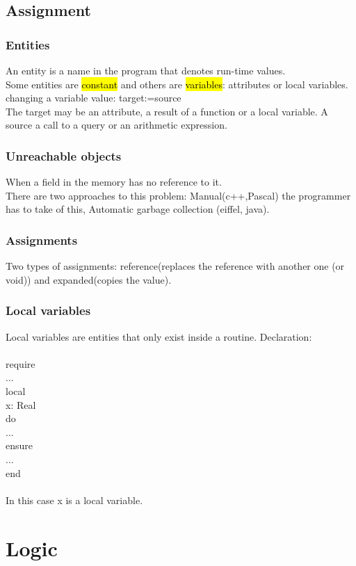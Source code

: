 \documentclass[11pt]{article}
\newcommand\tab[1][1cm]{\hspace*{#1}}
\begin{document}
\subsection{Assignment}
\subsubsection{Entities}
An entity is a name in the program that denotes run-time values.\\ Some entities are \hl{constant} and others are \hl{variables}: attributes or local variables.\\ changing a variable value: target:=source\\ The target may be an attribute, a result of a function or a local variable. A source a call to a query or an arithmetic expression.
\subsubsection{Unreachable objects}
When a field in the memory has no reference to it.\\There are two approaches to this problem: Manual(c++,Pascal) the programmer has to take of this, Automatic garbage collection (eiffel, java).
\subsubsection{Assignments}
Two types of assignments: reference(replaces the reference with another one (or void)) and expanded(copies the value).
\subsubsection{Local variables}
Local variables are entities that only exist inside a routine. Declaration:\\\\require\\\tab ...\\local\\\tab x: Real\\do\\\tab ...\\ensure\\\tab ...\\end\\\\ In this case x is a local variable.
\section{Logic}
\end{document}
